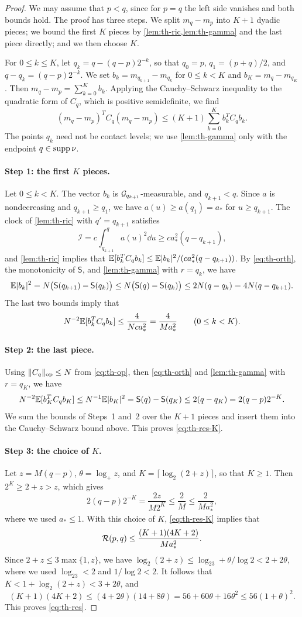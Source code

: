 \begin{proof}
We may assume that $p<q$, since for $p=q$ the left side vanishes and
both bounds hold. The proof has three steps. We split $m_q-m_p$ into
$K+1$ dyadic pieces; we bound the first $K$ pieces by
\cref{lem:th-ric,lem:th-gamma} and the last piece directly; and we then
choose $K$.

For $0\le k\le K$, let $q_k=q-(q-p)2^{-k}$, so that $q_0=p$,
$q_1=(p+q)/2$, and $q-q_k=(q-p)2^{-k}$. We set
$b_k=m_{q_{k+1}}-m_{q_k}$ for $0\le k<K$ and $b_K=m_q-m_{q_K}$. Then
$m_q-m_p=\sum_{k=0}^Kb_k$. Applying the Cauchy--Schwarz inequality to the
quadratic form of $C_q$, which is positive semidefinite, we find
\[
 (m_q-m_p)^TC_q(m_q-m_p)\le(K+1)\sum_{k=0}^Kb_k^TC_qb_k .
\]
The points $q_k$ need not be contact levels; we use \cref{lem:th-gamma}
only with the endpoint $q\in\operatorname{supp}\nu$.

\paragraph{Step 1: the first $K$ pieces.}
Let $0\le k<K$. The vector $b_k$ is $\mathcal G_{q_{k+1}}$-measurable, and
$q_{k+1}<q$. Since $a$ is nondecreasing and $q_{k+1}\ge q_1$, we have
$a(u)\ge a(q_1)=a_*$ for $u\ge q_{k+1}$. The clock of \cref{lem:th-ric}
with $q'=q_{k+1}$ satisfies
\[
 \mathcal I=c\int_{q_{k+1}}^qa(u)^2\dd u\ge ca_*^2(q-q_{k+1}),
\]
and \cref{lem:th-ric} implies that
$\mathbb E[b_k^TC_qb_k]\le\mathbb E|b_k|^2/(ca_*^2(q-q_{k+1}))$. By \eqref{eq:th-orth},
the monotonicity of $\mathsf S$, and \cref{lem:th-gamma} with $r=q_k$, we
have
\[
 \mathbb E|b_k|^2=N\bigl(\mathsf S(q_{k+1})-\mathsf S(q_k)\bigr)
 \le N\bigl(\mathsf S(q)-\mathsf S(q_k)\bigr)\le2N(q-q_k)=4N(q-q_{k+1}).
\]
The last two bounds imply that
\[
 N^{-2}\mathbb E[b_k^TC_qb_k]\le\frac4{Nca_*^2}=\frac4{Ma_*^2}
 \qquad(0\le k<K).
\]

\paragraph{Step 2: the last piece.}
Using $\|C_q\|_{\rm op}\le N$ from \eqref{eq:th-op}, then
\eqref{eq:th-orth} and \cref{lem:th-gamma} with $r=q_K$, we have
\[
 N^{-2}\mathbb E[b_K^TC_qb_K]\le N^{-1}\mathbb E|b_K|^2=\mathsf S(q)-\mathsf S(q_K)
 \le2(q-q_K)=2(q-p)2^{-K}.
\]
We sum the bounds of Steps~1 and~2 over the $K+1$ pieces and insert
them into the Cauchy--Schwarz bound above. This proves
\eqref{eq:th-res-K}.

\paragraph{Step 3: the choice of $K$.}
Let $z=M(q-p)$, $\theta=\log_+z$, and $K=\lceil\log_2(2+z)\rceil$, so that
$K\ge1$. Then $2^K\ge2+z>z$, which gives
\[
 2(q-p)2^{-K}=\frac{2z}{M2^K}\le\frac2M\le\frac2{Ma_*^2},
\]
where we used $a_*\le1$. With this choice of $K$, \eqref{eq:th-res-K}
implies that
\[
 \mathcal R(p,q)\le\frac{(K+1)(4K+2)}{Ma_*^2}.
\]
Since $2+z\le3\max\{1,z\}$, we have
$\log_2(2+z)\le\log_23+\theta/\log2<2+2\theta$, where we used
$\log_23<2$ and $1/\log2<2$. It follows that
$K<1+\log_2(2+z)<3+2\theta$, and
\[
 (K+1)(4K+2)\le(4+2\theta)(14+8\theta)=56+60\theta+16\theta^2
 \le56(1+\theta)^2 .
\]
This proves \eqref{eq:th-res}.
\end{proof}

